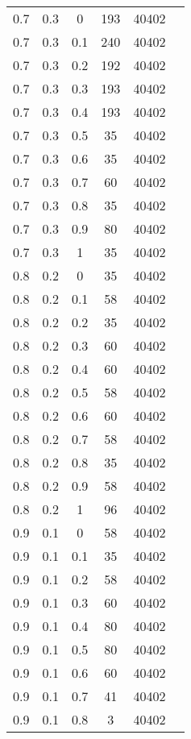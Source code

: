 \documentclass[a4paper,14pt]{extreport}
\begin{document}
\begin{table}
\begin{minipage}[!h]{0.50\hsize}
\begin{center}
{\begin{tabular}{c@{\hspace{5mm}}c@{\hspace{5mm}}c@{\hspace{5mm}}c@{\hspace{5mm}}c@{\hspace{5mm}}c}
					\midrule
					0.7     &0.3    &0      &193   &40402\\
					0.7     &0.3    &0.1    &240   &40402\\
					0.7     &0.3    &0.2    &192   &40402\\
					0.7     &0.3    &0.3    &193   &40402\\
					0.7     &0.3    &0.4    &193   &40402\\
					0.7     &0.3    &0.5    &35    &40402\\
					0.7     &0.3    &0.6    &35    &40402\\
					0.7     &0.3    &0.7    &60    &40402\\
					0.7     &0.3    &0.8    &35    &40402\\
					0.7     &0.3    &0.9    &80    &40402\\
					0.7     &0.3    &1      &35    &40402\\
					\midrule
					0.8     &0.2    &0      &35    &40402\\
					0.8     &0.2    &0.1    &58    &40402\\
					0.8     &0.2    &0.2    &35    &40402\\
					0.8     &0.2    &0.3    &60    &40402\\
					0.8     &0.2    &0.4    &60    &40402\\
					0.8     &0.2    &0.5    &58    &40402\\
					0.8     &0.2    &0.6    &60    &40402\\
					0.8     &0.2    &0.7    &58    &40402\\
					0.8     &0.2    &0.8    &35    &40402\\
					0.8     &0.2    &0.9    &58    &40402\\
					0.8     &0.2    &1      &96    &40402\\
					\midrule
					0.9     &0.1    &0      &58    &40402\\
					0.9     &0.1    &0.1    &35    &40402\\
					0.9     &0.1    &0.2    &58    &40402\\
					0.9     &0.1    &0.3    &60    &40402\\
					0.9     &0.1    &0.4    &80    &40402\\
					0.9     &0.1    &0.5    &80    &40402\\
					0.9     &0.1    &0.6    &60    &40402\\
					0.9     &0.1    &0.7    &41    &40402\\
					0.9     &0.1    &0.8    &3     &40402\\

\end{tabular}}
\end{center}
\end{minipage}
\end{table}
\end{document}
